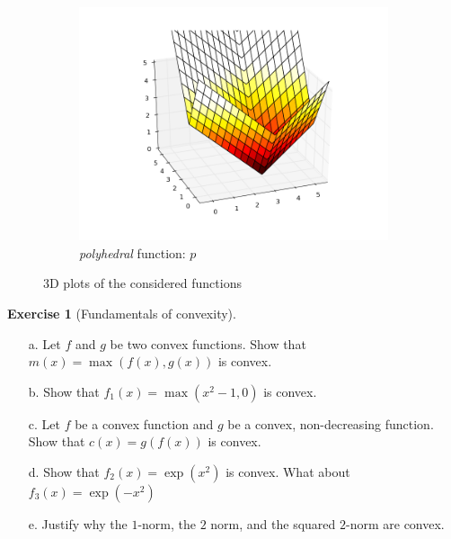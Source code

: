 \documentclass[a4paper,twoside,10pt]{amsart}
\numberwithin{equation}{section} %
\numberwithin{figure}{section} %
\numberwithin{table}{section} %
\theoremstyle{definition}
\newtheorem{q_td}{Exercise }
\begin{document}
\begin{figure}[h!]
\begin{subfigure}[b]{0.48\textwidth}
        \includegraphics[width=1.0\textwidth]{poly.png}
        \caption{\emph{polyhedral} function: $p$}
    \end{subfigure}
    \caption{3D plots of the considered functions}
	\label{fig:3d}
\end{figure}



\vspace*{0.5cm}

\begin{q_td}[Fundamentals of convexity]
\label{td:conv}
~
\begin{itemize}
\item[a.] Let $f$ and $g$ be two convex functions. Show that $m(x) = \max(f(x),g(x) )$ is convex.
\item[b.] Show that $f_1(x) = \max(x^2-1 , 0)$ is convex. 
\item[c.] Let $f$ be a convex function and $g$ be a convex, non-decreasing function. Show that $c(x) = g(f(x))$ is convex.
\item[d.] Show that $f_2(x) =  \exp(x^2)$ is convex. What about $f_3(x) =  \exp(-x^2)$ 
\item[e.] Justify why the $1$-norm, the $2$ norm, and the squared $2$-norm are convex.
\end{itemize}
\end{q_td}

\vspace*{0.5cm}
\end{document}
